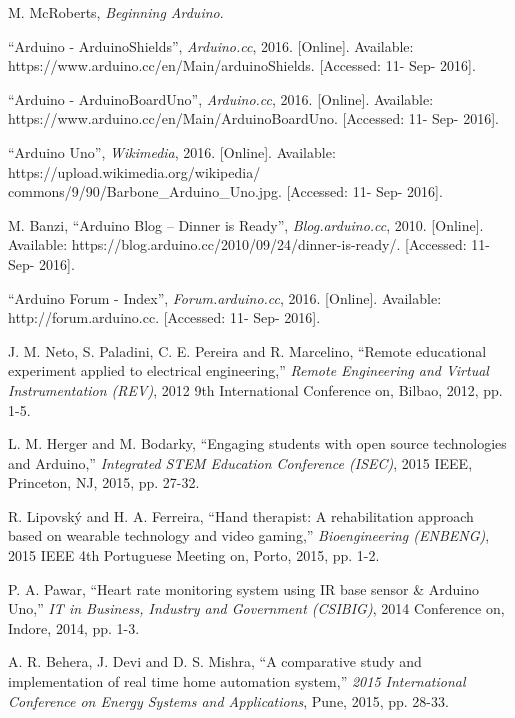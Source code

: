 \documentclass[11pt,letterpaper,twocolumn]{article}
\begin{document}
\begin{thebibliography}{1}
     M. McRoberts, {\it Beginning Arduino}.

     ``Arduino - ArduinoShields'', {\it Arduino.cc}, 2016. [Online]. Available: https://www.arduino.cc/en/Main/arduinoShields. [Accessed: 11- Sep- 2016].

     ``Arduino - ArduinoBoardUno'', {\it Arduino.cc}, 2016. [Online]. Available: https://www.arduino.cc/en/Main/ArduinoBoardUno. [Accessed: 11- Sep- 2016].

     ``Arduino Uno'', {\it Wikimedia}, 2016. [Online]. Available: https://upload.wikimedia.org/wikipedia/ commons/9/90/Barbone\_Arduino\_Uno.jpg. [Accessed: 11- Sep- 2016].

     M. Banzi, ``Arduino Blog – Dinner is Ready'', {\it Blog.arduino.cc}, 2010. [Online]. Available: https://blog.arduino.cc/2010/09/24/dinner-is-ready/. [Accessed: 11- Sep- 2016].

     ``Arduino Forum - Index'', {\it Forum.arduino.cc}, 2016. [Online]. Available: http://forum.arduino.cc. [Accessed: 11- Sep- 2016].

     J. M. Neto, S. Paladini, C. E. Pereira and R. Marcelino, ``Remote educational experiment applied to electrical engineering,'' {\it Remote Engineering and Virtual Instrumentation (REV)}, 2012 9th International Conference on, Bilbao, 2012, pp. 1-5.

     L. M. Herger and M. Bodarky, ``Engaging students with open source technologies and Arduino,'' {\it Integrated STEM Education Conference (ISEC)}, 2015 IEEE, Princeton, NJ, 2015, pp. 27-32.

     R. Lipovský and H. A. Ferreira, ``Hand therapist: A rehabilitation approach based on wearable technology and video gaming,'' {\it Bioengineering (ENBENG)}, 2015 IEEE 4th Portuguese Meeting on, Porto, 2015, pp. 1-2.

     P. A. Pawar, ``Heart rate monitoring system using IR base sensor \& Arduino Uno,'' {\it IT in Business, Industry and Government (CSIBIG)}, 2014 Conference on, Indore, 2014, pp. 1-3.

     A. R. Behera, J. Devi and D. S. Mishra, ``A comparative study and implementation of real time home automation system,'' {\it 2015 International Conference on Energy Systems and Applications}, Pune, 2015, pp. 28-33.
\end{thebibliography}
\end{document}
